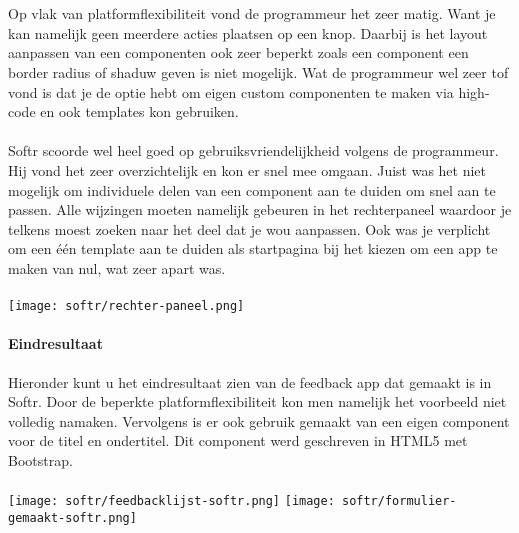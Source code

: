 \\
\\
Op vlak van platformflexibiliteit vond de programmeur het zeer matig. 
Want je kan namelijk geen meerdere acties plaatsen op een knop. 
Daarbij is het layout aanpassen van een componenten ook zeer beperkt zoals een component een border radius of shaduw geven is niet mogelijk. 
Wat de programmeur wel zeer tof vond is dat je de optie hebt om eigen custom componenten te maken via high-code en ook templates kon gebruiken.
\\
\\
Softr scoorde wel heel goed op gebruiksvriendelijkheid volgens de programmeur. 
Hij vond het zeer overzichtelijk en kon er snel mee omgaan. 
Juist was het niet mogelijk om individuele delen van een component aan te duiden om snel aan te passen. 
Alle wijzingen moeten namelijk gebeuren in het rechterpaneel waardoor je telkens moest zoeken naar het deel dat je wou aanpassen. 
Ook was je verplicht om een één template aan te duiden als startpagina bij het kiezen om een app te maken van nul, wat zeer apart was. 
\\
\\
\texttt{[image: softr/rechter-paneel.png]}
\paragraph*{Eindresultaat}
Hieronder kunt u het eindresultaat zien van de feedback app dat gemaakt is in Softr. Door de beperkte platformflexibiliteit kon men namelijk het voorbeeld niet volledig namaken. 
Vervolgens is er ook gebruik gemaakt van een eigen component voor de titel en ondertitel. Dit component werd geschreven in HTML5 met Bootstrap.
\\
\\
\texttt{[image: softr/feedbacklijst-softr.png]}
\texttt{[image: softr/formulier-gemaakt-softr.png]}
